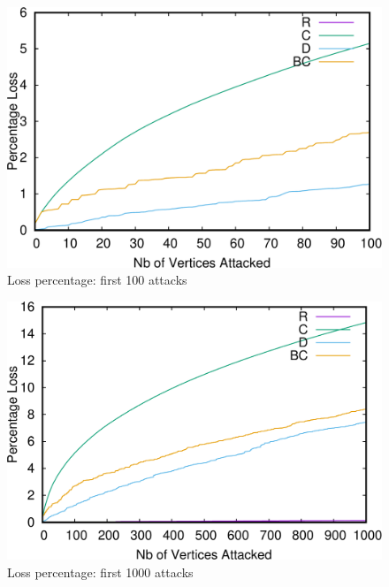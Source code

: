 \begin{figure}
\centering
\includegraphics[scale=0.35]{bench/loss-100-crop.pdf}
\caption{Loss percentage: first 100 attacks}
\label{fig:loss-100}
\end{figure}

\begin{figure}
\centering
\includegraphics[scale=0.35]{bench/loss-1000-crop.pdf}
\caption{Loss percentage: first 1000 attacks}
\label{fig:loss-1000}
\end{figure}

